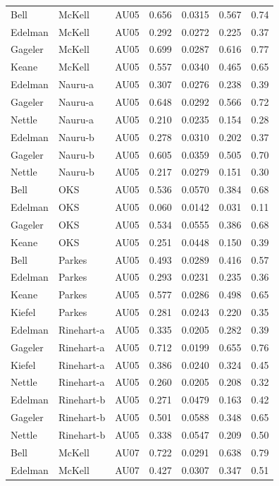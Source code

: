 \documentclass{monashthesis}
\begin{document}
\begin{center}
\begin{longtable}{lllllll}
Bell & McKell & AU05 & 0.656 & 0.0315 & 0.567 & 0.74 \\
Edelman & McKell & AU05 & 0.292 & 0.0272 & 0.225 & 0.37 \\
Gageler & McKell & AU05 & 0.699 & 0.0287 & 0.616 & 0.77 \\
Keane & McKell & AU05 & 0.557 & 0.0340 & 0.465 & 0.65 \\
Edelman & Nauru-a & AU05 & 0.307 & 0.0276 & 0.238 & 0.39 \\
Gageler & Nauru-a & AU05 & 0.648 & 0.0292 & 0.566 & 0.72 \\
Nettle & Nauru-a & AU05 & 0.210 & 0.0235 & 0.154 & 0.28 \\
Edelman & Nauru-b & AU05 & 0.278 & 0.0310 & 0.202 & 0.37 \\
Gageler & Nauru-b & AU05 & 0.605 & 0.0359 & 0.505 & 0.70 \\
Nettle & Nauru-b & AU05 & 0.217 & 0.0279 & 0.151 & 0.30 \\
Bell & OKS & AU05 & 0.536 & 0.0570 & 0.384 & 0.68 \\
Edelman & OKS & AU05 & 0.060 & 0.0142 & 0.031 & 0.11 \\
Gageler & OKS & AU05 & 0.534 & 0.0555 & 0.386 & 0.68 \\
Keane & OKS & AU05 & 0.251 & 0.0448 & 0.150 & 0.39 \\
Bell & Parkes & AU05 & 0.493 & 0.0289 & 0.416 & 0.57 \\
Edelman & Parkes & AU05 & 0.293 & 0.0231 & 0.235 & 0.36 \\
Keane & Parkes & AU05 & 0.577 & 0.0286 & 0.498 & 0.65 \\
Kiefel & Parkes & AU05 & 0.281 & 0.0243 & 0.220 & 0.35 \\
Edelman & Rinehart-a & AU05 & 0.335 & 0.0205 & 0.282 & 0.39 \\
Gageler & Rinehart-a & AU05 & 0.712 & 0.0199 & 0.655 & 0.76 \\
Kiefel & Rinehart-a & AU05 & 0.386 & 0.0240 & 0.324 & 0.45 \\
Nettle & Rinehart-a & AU05 & 0.260 & 0.0205 & 0.208 & 0.32 \\
Edelman & Rinehart-b & AU05 & 0.271 & 0.0479 & 0.163 & 0.42 \\
Gageler & Rinehart-b & AU05 & 0.501 & 0.0588 & 0.348 & 0.65 \\
Nettle & Rinehart-b & AU05 & 0.338 & 0.0547 & 0.209 & 0.50 \\
Bell & McKell & AU07 & 0.722 & 0.0291 & 0.638 & 0.79 \\
Edelman & McKell & AU07 & 0.427 & 0.0307 & 0.347 & 0.51 \\

\end{longtable}
\end{center}
\end{document}
